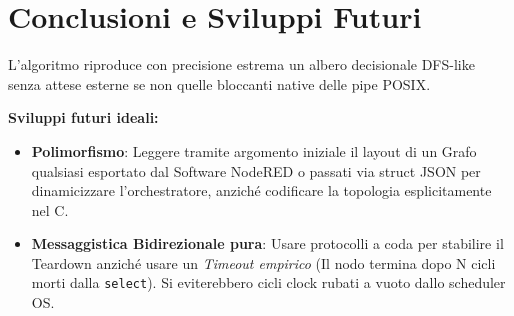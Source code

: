 \documentclass[a4paper,12pt]{article}
\begin{document}
\section{Conclusioni e Sviluppi Futuri}
L'algoritmo riproduce con precisione estrema un albero decisionale DFS-like senza attese esterne se non quelle bloccanti native delle pipe POSIX.

\noindent \textbf{Sviluppi futuri ideali:}
\begin{itemize}
    \item \textbf{Polimorfismo}: Leggere tramite argomento iniziale il layout di un Grafo qualsiasi esportato dal Software NodeRED o passati via struct JSON per dinamicizzare l'orchestratore, anziché codificare la topologia esplicitamente nel C.
    \item \textbf{Messaggistica Bidirezionale pura}: Usare protocolli a coda per stabilire il Teardown anziché usare un \textit{Timeout empirico} (Il nodo termina dopo N cicli morti dalla \texttt{select}). Si eviterebbero cicli clock rubati a vuoto dallo scheduler OS.
\end{itemize}
\end{document}
